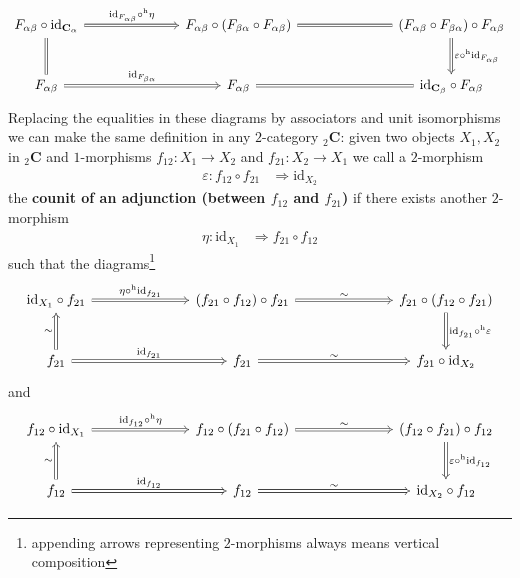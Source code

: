 \begin{equation*}
\begin{tikzcd}[row sep=large,column sep=7em]
  F_{\alpha\beta}
  \circ
  \mathrm{id}_{\mathbf{C}_{\alpha}}
  \arrow[Rightarrow]{r}{\mathrm{id}_{F_{\alpha\beta}} \circ^{\mathrm{h}} \eta}
  &
  F_{\alpha\beta}
  \circ
  (F_{\beta\alpha} \circ F_{\alpha\beta})
  \arrow[equal]{r}
  &
  (F_{\alpha\beta} \circ F_{\beta\alpha})
  \circ
  F_{\alpha\beta}
  \arrow[Rightarrow]{d}{\varepsilon \circ^{\mathrm{h}} \mathrm{id}_{F_{\alpha\beta}}}
  \\
  F_{\alpha\beta}
  \arrow[equal]{u}
  \arrow[Rightarrow]{r}{\mathrm{id}_{F_{\beta\alpha}}}
  &
  F_{\alpha\beta}
  \arrow[equal]{r}
  &
  \mathrm{id}_{\mathbf{C}_{\beta}}
  \circ
  F_{\alpha\beta}
\end{tikzcd}
\end{equation*}
Replacing the equalities in these diagrams by associators and unit isomorphisms we can make the same definition in any $2$-category ${_{2}}\mathbf{C}$: given two objects $X_{1},X_{2}$ in ${_{2}}\mathbf{C}$ and $1$-morphisms $f_{12} \colon X_{1} \to X_{2}$ and $f_{21} \colon X_{2} \to X_{1}$ we call a $2$-morphism
\begin{align*}
  \varepsilon
  \colon
  f_{12}
  \circ
  f_{21}
  &\Rightarrow
  \mathrm{id}_{X_{2}}
\end{align*}
the \textbf{counit of an adjunction (between $f_{12}$ and $f_{21}$)} if there exists another $2$-morphism
\begin{align*}
  \eta
  \colon
  \mathrm{id}_{X_{1}}
  &\Rightarrow
  f_{21}
  \circ
  f_{12}
\end{align*}
such that the diagrams\footnote{appending arrows representing $2$-morphisms always means vertical composition}
\begin{equation*}
\begin{tikzcd}[row sep=large,column sep=7em]
  \mathrm{id}_{X_{1}}
  \circ
  f_{21}
  \arrow[Rightarrow]{r}{\eta \circ^{\mathrm{h}} \mathrm{id}_{f_{21}}}
  &
  (f_{21} \circ f_{12})
  \circ
  f_{21}
  \arrow[Rightarrow]{r}{\sim}
  &
  f_{21}
  \circ
  (f_{12} \circ f_{21})
  \arrow[Rightarrow]{d}{\mathrm{id}_{f_{21}} \circ^{\mathrm{h}} \varepsilon}
  \\
  f_{21}
  \arrow[Rightarrow]{u}{\sim}
  \arrow[Rightarrow]{r}{\mathrm{id}_{f_{21}}}
  &
  f_{21}
  \arrow[Rightarrow]{r}{\sim}
  &
  f_{21}
  \circ
  \mathrm{id}_{X_{2}}
\end{tikzcd}
\end{equation*}
and
\begin{equation*}
\begin{tikzcd}[row sep=large,column sep=7em]
  f_{12}
  \circ
  \mathrm{id}_{X_{1}}
  \arrow[Rightarrow]{r}{\mathrm{id}_{f_{12}} \circ^{\mathrm{h}} \eta}
  &
  f_{12}
  \circ
  (f_{21} \circ f_{12})
  \arrow[Rightarrow]{r}{\sim}
  &
  (f_{12} \circ f_{21})
  \circ
  f_{12}
  \arrow[Rightarrow]{d}{\varepsilon \circ^{\mathrm{h}} \mathrm{id}_{f_{12}}}
  \\
  f_{12}
  \arrow[Rightarrow]{u}{\sim}
  \arrow[Rightarrow]{r}{\mathrm{id}_{f_{12}}}
  &
  f_{12}
  \arrow[Rightarrow]{r}{\sim}
  &
  \mathrm{id}_{X_{2}}
  \circ
  f_{12}
\end{tikzcd}
\end{equation*}
